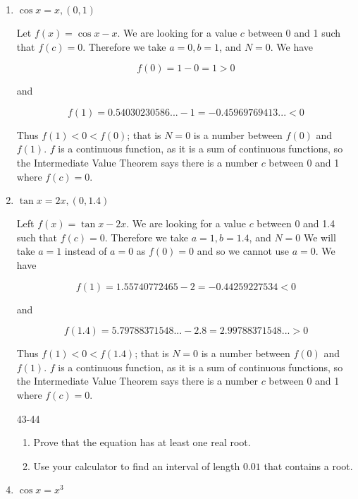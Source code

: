 \documentclass{article}
\begin{document}
\begin{enumerate}
			\item $\cos x = x, (0,1)$

				Let $f(x) = \cos x - x$. We are looking for a value $c$ between 0 and 1 such
				that $f(c) = 0$. Therefore we take $a = 0, b = 1$, and $N = 0$. We have

				$$f(0) = 1 - 0 = 1 > 0$$

				and 

				$$f(1) = 0.54030230586... - 1 = -0.45969769413... < 0$$

				Thus $f(1) < 0 < f(0)$; that is $N = 0$ is a number between $f(0)$ and $f(1)$.
				$f$ is a continuous function, as it is a sum of continuous functions, so the
				Intermediate Value Theorem says there is a number $c$ between 0 and 1 where
				$f(c) = 0$.

			\item $\tan x = 2x, (0,1.4)$

				Left $f(x) = \tan x - 2x$. We are looking for a value $c$ between 0 and 1.4
				such that $f(c) = 0$. Therefore we take $a = 1, b = 1.4$, and $N = 0$ We will
				take $a=1$ instead of $a=0$ as $f(0) = 0$ and so we cannot use $a=0$. We
				have 

				$$f(1) = 1.55740772465 - 2 = -0.44259227534 < 0$$

				and

				$$f(1.4) = 5.79788371548... - 2.8 = 2.99788371548... > 0$$

				Thus $f(1) < 0 < f(1.4)$; that is $N = 0$ is a number between $f(0)$ and
				$f(1)$. $f$ is a continuous function, as it is a sum of continuous functions,
				so the Intermediate Value Theorem says there is a number $c$ between 0 and
				1 where $f(c) = 0$.

			\item[43-44]

			\begin{enumerate}
				\item Prove that the equation has at least one real root.

				\item Use your calculator to find an interval of length $0.01$ that
					contains a root.
			\end{enumerate}

			\item $\cos x = x^3$
	\end{enumerate}
\end{document}
